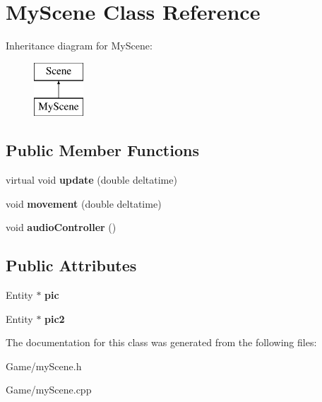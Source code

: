 \hypertarget{class_my_scene}{}\section{My\+Scene Class Reference}
\label{class_my_scene}
Inheritance diagram for My\+Scene\+:\begin{figure}[H]
\begin{center}
\leavevmode
\includegraphics[height=2.000000cm]{class_my_scene}
\end{center}
\end{figure}
\subsection*{Public Member Functions}
\begin{DoxyCompactItemize}
\item 
\mbox{\label{class_my_scene_aa1016cb40c6434d1d1325e75aa8b03e3}} 
virtual void {\bfseries update} (double deltatime)
\item 
\mbox{\label{class_my_scene_a6429232130b7cfe544c3d5bcfdfebbe1}} 
void {\bfseries movement} (double deltatime)
\item 
\mbox{\label{class_my_scene_a22da8d1e895d7b694884760376f8da16}} 
void {\bfseries audio\+Controller} ()
\end{DoxyCompactItemize}
\subsection*{Public Attributes}
\begin{DoxyCompactItemize}
\item 
\mbox{\label{class_my_scene_af99b8c0bddf8966cd6593c1b29ecdbdd}} 
Entity $\ast$ {\bfseries pic}
\item 
\mbox{\label{class_my_scene_a0c5fbaf05bc701772e96c9a757e9d71c}} 
Entity $\ast$ {\bfseries pic2}
\end{DoxyCompactItemize}


The documentation for this class was generated from the following files\+:\begin{DoxyCompactItemize}
\item 
Game/my\+Scene.\+h\item 
Game/my\+Scene.\+cpp\end{DoxyCompactItemize}
